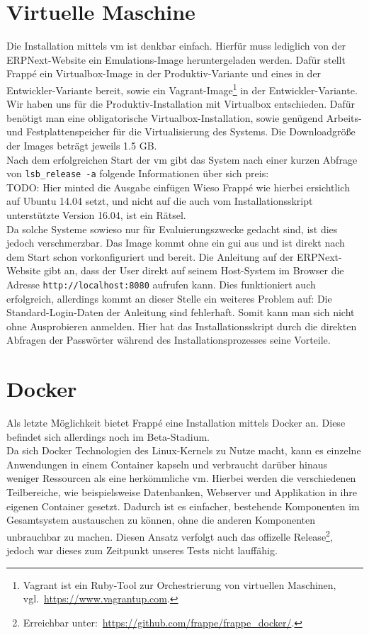 \section{Virtuelle Maschine}
Die Installation mittels \gls{vm} ist denkbar einfach. Hierfür muss lediglich von der ERPNext-Website ein Emulations-Image heruntergeladen werden. Dafür stellt Frappé ein Virtualbox-Image in der Produktiv-Variante und eines in der Entwickler-Variante bereit, sowie ein Vagrant-Image\footnote{Vagrant ist ein Ruby-Tool zur Orchestrierung von virtuellen Maschinen, vgl.\ \url{https://www.vagrantup.com}.} in der Entwickler-Variante.\\
Wir haben uns für die Produktiv-Installation mit Virtualbox entschieden.
Dafür benötigt man eine obligatorische Virtualbox-Installation, sowie genügend Arbeits- und Festplattenspeicher für die Virtualisierung des Systems. Die Downloadgröße der Images beträgt jeweils 1.5 GB.\\ Nach dem erfolgreichen Start der \gls{vm} gibt das System nach einer kurzen Abfrage von \texttt{lsb\_release -a} folgende Informationen über sich preis:\\
TODO: Hier minted die Ausgabe einfügen
Wieso Frappé wie hierbei ersichtlich auf Ubuntu 14.04 setzt, und nicht auf die auch vom Installationsskript unterstützte Version 16.04, ist ein Rätsel.\\
Da solche Systeme sowieso nur für Evaluierungszwecke gedacht sind, ist dies jedoch verschmerzbar.
Das Image kommt ohne ein \gls{gui} aus und ist direkt nach dem Start schon vorkonfiguriert und bereit. Die Anleitung auf der ERPNext-Website gibt an, dass der User direkt auf seinem Host-System im Browser die Adresse \texttt{http://localhost:8080} aufrufen kann. Dies funktioniert auch erfolgreich, allerdings kommt an dieser Stelle ein weiteres Problem auf: Die Standard-Login-Daten der Anleitung sind fehlerhaft. Somit kann man sich nicht ohne Ausprobieren anmelden. Hier hat das Installationsskript durch die direkten Abfragen der Passwörter während des Installationsprozesses seine Vorteile.

\section{Docker}
Als letzte Möglichkeit bietet Frappé eine Installation mittels Docker an. Diese befindet sich allerdings noch im Beta-Stadium. \\
Da sich Docker Technologien des Linux-Kernels zu Nutze macht, kann es einzelne Anwendungen in einem Container kapseln und verbraucht darüber hinaus weniger Ressourcen als eine herkömmliche \gls{vm}. 
Hierbei werden die verschiedenen Teilbereiche, wie beispielsweise Datenbanken, Webserver und Applikation in ihre eigenen Container gesetzt. Dadurch ist es einfacher, bestehende Komponenten im Gesamtsystem austauschen zu können, ohne die anderen Komponenten unbrauchbar zu machen. 
Diesen Ansatz verfolgt auch das offizelle Release\footnote{Erreichbar unter:\ \url{https://github.com/frappe/frappe_docker/}.}, jedoch war dieses zum Zeitpunkt unseres Tests nicht lauffähig.

